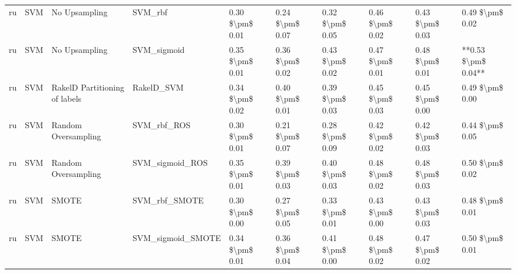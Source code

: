 \begin{tabular}{llllllllll}
      ru &                             SVM &                 No Upsampling &                                      SVM\_rbf & 0.30 \$\textbackslash pm\$ 0.01 &           0.24 \$\textbackslash pm\$ 0.07 &       0.32 \$\textbackslash pm\$ 0.05 &        0.46 \$\textbackslash pm\$ 0.02 &                         0.43 \$\textbackslash pm\$ 0.03 &     0.49 \$\textbackslash pm\$ 0.02 \\
      ru &                             SVM &                 No Upsampling &                                  SVM\_sigmoid & 0.35 \$\textbackslash pm\$ 0.01 &           0.36 \$\textbackslash pm\$ 0.02 &       0.43 \$\textbackslash pm\$ 0.02 &        0.47 \$\textbackslash pm\$ 0.01 &                         0.48 \$\textbackslash pm\$ 0.01 & **0.53 \$\textbackslash pm\$ 0.04** \\
      ru &                             SVM & RakelD Partitioning of labels &                                   RakelD\_SVM & 0.34 \$\textbackslash pm\$ 0.02 &           0.40 \$\textbackslash pm\$ 0.01 &       0.39 \$\textbackslash pm\$ 0.03 &        0.45 \$\textbackslash pm\$ 0.03 &                         0.45 \$\textbackslash pm\$ 0.00 &     0.49 \$\textbackslash pm\$ 0.00 \\
      ru &                             SVM &           Random Oversampling &                                  SVM\_rbf\_ROS & 0.30 \$\textbackslash pm\$ 0.01 &           0.21 \$\textbackslash pm\$ 0.07 &       0.28 \$\textbackslash pm\$ 0.09 &        0.42 \$\textbackslash pm\$ 0.02 &                         0.42 \$\textbackslash pm\$ 0.03 &     0.44 \$\textbackslash pm\$ 0.05 \\
      ru &                             SVM &           Random Oversampling &                              SVM\_sigmoid\_ROS & 0.35 \$\textbackslash pm\$ 0.01 &           0.39 \$\textbackslash pm\$ 0.03 &       0.40 \$\textbackslash pm\$ 0.03 &        0.48 \$\textbackslash pm\$ 0.02 &                         0.48 \$\textbackslash pm\$ 0.03 &     0.50 \$\textbackslash pm\$ 0.02 \\
      ru &                             SVM &                         SMOTE &                                SVM\_rbf\_SMOTE & 0.30 \$\textbackslash pm\$ 0.00 &           0.27 \$\textbackslash pm\$ 0.05 &       0.33 \$\textbackslash pm\$ 0.01 &        0.43 \$\textbackslash pm\$ 0.00 &                         0.43 \$\textbackslash pm\$ 0.03 &     0.48 \$\textbackslash pm\$ 0.01 \\
      ru &                             SVM &                         SMOTE &                            SVM\_sigmoid\_SMOTE & 0.34 \$\textbackslash pm\$ 0.01 &           0.36 \$\textbackslash pm\$ 0.04 &       0.41 \$\textbackslash pm\$ 0.00 &        0.48 \$\textbackslash pm\$ 0.02 &                         0.47 \$\textbackslash pm\$ 0.02 &     0.50 \$\textbackslash pm\$ 0.01 \\

\end{tabular}

